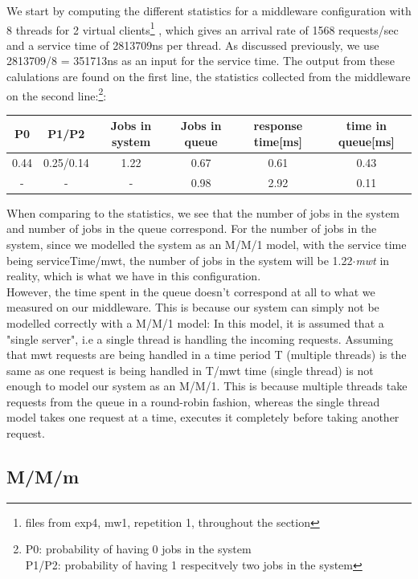 \documentclass[11pt,a4paper]{article}
\begin{document}
We start by computing the different statistics for a middleware configuration with 8 threads for 2 virtual clients\footnote{files from exp4, mw1, repetition 1, throughout the section} , which gives an arrival rate of 1568 requests/sec and a service time of 2813709ns per thread. As discussed previously, we use 2813709/8 = 351713ns as an input for the service time. The output from these calulations are found on the first line, the statistics collected from the middleware on the second line:\footnote{P0: probability of having 0 jobs in the system\\P1/P2: probability of having 1 respecitvely two jobs in the system}: 
\begin{center}

		\begin{tabular}{|c|c|c|c|c|c|}
			  \hline
			  \textbf{P0} & \textbf{P1/P2} & \textbf{Jobs in system} & \textbf{Jobs in queue} & \textbf{response time[ms]} & \textbf{time in queue[ms]}\\
			  \hline
			  0.44 & 0.25/0.14 & 1.22 & 0.67 & 0.61 & 0.43 \\
			  - & - & - & 0.98  & 2.92 & 0.11 \\
			  \hline
		\end{tabular}
 
\end{center}
When comparing to the statistics, we see that the number of jobs in the system and number of jobs in the queue correspond. For the number of jobs in the system, since we modelled the system as an M/M/1 model, with the service time being serviceTime/mwt, the number of jobs in the system will be 1.22$\cdot$\textit{mwt} in reality, which is what we have in this configuration. 
 \\
However, the time spent in the queue doesn't correspond at all to what we measured on our middleware. This is because our system can simply not be modelled correctly with a M/M/1 model: In this model, it is assumed that a "single server", i.e a single thread is handling the incoming requests. Assuming that mwt requests are being handled in a time period T (multiple threads) is the same as one request is being handled in T/mwt time (single thread) is not enough to model our system as an M/M/1. This is because multiple threads take requests from the queue in a round-robin fashion, whereas the single thread model takes one request at a time, executes it completely before taking another request. 

  
\subsection{M/M/m}
\end{document}
